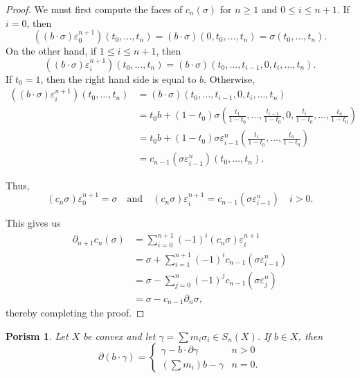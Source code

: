 \documentclass[10pt]{article}
\theoremstyle{thmstyle}
\theoremstyle{defstyle}
\newtheorem{porism}[theorem]{Porism}
\renewcommand{\le}{\leqslant}
\renewcommand{\ge}{\geqslant}
\begin{document}
\begin{proof}
    We must first compute the faces of $c_n(\sigma)$ for $n\ge 1$ and $0\le i\le n + 1$. If $i = 0$, then 
    \begin{equation*}
        ((b\cdot\sigma)\varepsilon_0^{n + 1})(t_0,\dots,t_n) = (b\cdot\sigma)(0,t_0,\dots,t_n) = \sigma(t_0,\dots, t_n).
    \end{equation*}
    On the other hand, if $1\le i\le n + 1$, then 
    \begin{equation*}
        ((b\cdot\sigma)\varepsilon^{n + 1}_i)(t_0,\dots, t_n) = (b\cdot\sigma)(t_0,\dots, t_{i - 1},0,t_i,\dots, t_n).
    \end{equation*}
    If $t_0 = 1$, then the right hand side is equal to $b$. Otherwise, 
    \begin{align*}
        ((b\cdot\sigma)\varepsilon^{n + 1}_i)(t_0,\dots, t_n) &= (b\cdot\sigma)(t_0,\dots,t_{i - 1}, 0,t_i,\dots, t_n)\\
        &= t_0b + (1 - t_0)\sigma\left(\frac{t_1}{1 - t_0}, \dots,\frac{t_{i - 1}}{1 - t_0},0,\frac{t_i}{1 - t_0},\dots,\frac{t_n}{1 - t_0}\right)\\
        &= t_0b + (1 - t_0)\sigma\varepsilon_{i - 1}^n \left(\frac{t_1}{1 - t_0},\dots,\frac{t_n}{1 - t_0}\right)\\
        &= c_{n - 1}(\sigma\varepsilon_{i - 1}^n)(t_0,\dots, t_n).
    \end{align*}

    Thus, 
    \begin{equation*}
        (c_n\sigma)\varepsilon^{n + 1}_0 = \sigma \quad\text{and}\quad(c_n\sigma)\varepsilon^{n + 1}_i = c_{n - 1}(\sigma\varepsilon^{n}_{i - 1})\quad i > 0.
    \end{equation*}

    This gives us 
    \begin{align*}
        \partial_{n + 1}c_n(\sigma) &= \sum_{i = 0}^{n + 1}(-1)^i (c_n\sigma)\varepsilon_i^{n + 1}\\
        &= \sigma + \sum_{i = 1}^{n + 1}(-1)^i c_{n - 1}(\sigma\varepsilon^n_{i - 1})\\
        &= \sigma - \sum_{j = 0}^{n} (-1)^j c_{n - 1}(\sigma\varepsilon^n_j)\\
        &= \sigma - c_{n - 1}\partial_n\sigma,
    \end{align*}
    thereby completing the proof.
\end{proof}

\begin{porism}
    Let $X$ be convex and let $\gamma = \sum m_i\sigma_i\in S_n(X)$. If $b\in X$, then 
    \begin{equation*}
        \partial(b\cdot\gamma) = 
        \begin{cases}
            \gamma - b\cdot\partial\gamma & n > 0\\
            \left(\sum m_i\right)b - \gamma & n = 0.
        \end{cases}
    \end{equation*}
\end{porism}
\end{document}
